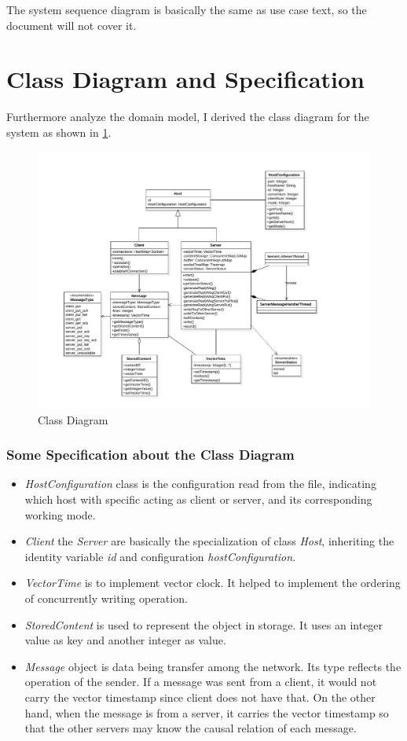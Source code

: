 \documentclass[11pt,letterpaper,en-US]{article}
\begin{document}
The system sequence diagram is basically the same as use case text, so the document will not cover it.

\section{Class Diagram and Specification}
Furthermore analyze the domain model, I derived the class diagram for the system as shown in \cref{classdia}.

\begin{figure}[!hb]
    \caption{Class Diagram}\label{classdia}
    \centering
    \includegraphics[width=\textwidth]{classdiagram}
\end{figure}

\subsubsection*{Some Specification about the Class Diagram}
\begin{itemize}
    \item \emph{HostConfiguration} class is the configuration read from the file,
        indicating which host with specific acting as client or server,
        and its corresponding working mode.
    \item \emph{Client} the \emph{Server} are basically the specialization of class \emph{Host},
        inheriting the identity variable \emph{id} and configuration \emph{hostConfiguration}.
    \item \emph{VectorTime} is to implement vector clock. It helped to implement the
        ordering of concurrently writing operation.
    \item \emph{StoredContent} is used to represent the object in storage. It uses an
        integer value as key and another integer as value.
    \item \emph{Message} object is data being transfer among the network. Its type reflects
        the operation of the sender. If a message was sent from a client, it would not
        carry the vector timestamp since client does not have that. On the other hand,
        when the message is from a server, it carries the vector timestamp so that the
        other servers may know the causal relation of each message.
\end{itemize}
\end{document}
